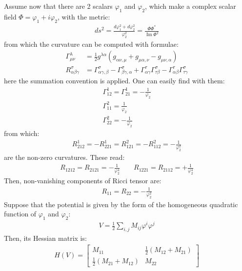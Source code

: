 \documentclass[fleqn]{article}
\begin{document}
\indent Assume now that there are 2 scalars $\varphi _1$ and $\varphi _2$, which make a complex scalar field $\Phi = \varphi _1 +i \varphi _2$, with the metric:
\begin{align}
ds^{2} = \frac{d\varphi _{1} ^{2} + d\varphi _{2} ^{2}} {\varphi _{2} ^{2} } = \frac{\Phi \Phi ^{*}} {\operatorname{Im} \Phi ^{2}}
\end{align}
from which the curvature can be computed with formulae:
\begin{align}
\Gamma _{\mu \nu} ^{\lambda} & = \frac{1}{2} g^{\lambda \alpha} (g_{\alpha \nu , \mu} + g_{\mu \alpha , \nu} - g_{\mu \nu , \alpha}) \\
R_{\alpha \beta \gamma} ^{\sigma} &= \Gamma _{\alpha \gamma ,\beta} ^{\sigma} - \Gamma _{\beta \gamma , \alpha} ^{\sigma} + \Gamma _{\alpha \gamma }^{\tau} \Gamma _{\tau \beta} ^{\sigma} - \Gamma _{\alpha \beta} ^{\tau} \Gamma _{\tau \gamma} ^{\sigma}
\end{align}
here the summation convention is applied. One can easily find with them:
\begin{align}
\Gamma _{12}^{1} = \Gamma _{21}^{1} =-\frac{1}{\varphi _2} \\
\Gamma _{11}^{2} = \frac{1}{\varphi _2} \\
\Gamma _{22} ^{2} = -\frac{1}{\varphi _2}
\end{align}
from which:
\begin{align}
R_{212}^{1} = -R_{221}^{1} = R_{121} ^{2} = - R_{112}^{2} = -\frac{1}{\varphi _{2} ^{2}}
\end{align}
are the non-zero curvatures. These read:
\begin{align}
R_{1212} = R_{2121} = -\frac{1}{\varphi_{2}^{4}} \qquad R_{1221} = R_{2112} =+ \frac{1}{\varphi_{2} ^{4}}
\end{align}
Then, non-vanishing components of Ricci tensor are:
\begin{align}
R_{11} = R_{22} = -\frac{1}{\varphi _{2} ^{2}}
\end{align}
Suppose that the potential is given by the form of the homogeneous quadratic function of $\varphi _1$ and $\varphi _2$:
\begin{align}
V = \frac{1}{2} \sum _{i,j} M_{ij} \varphi ^{i} \varphi ^{j}
\end{align}
Then, its Hessian matrix is:
\begin{align}
H(V) = \begin{bmatrix}
M_{11} & \frac{1}{2}(M_{12} +M_{21})\\
\frac{1}{2}(M_{21}+M_{12} )& M_{22}
\end{bmatrix}
\end{align}
\end{document}
